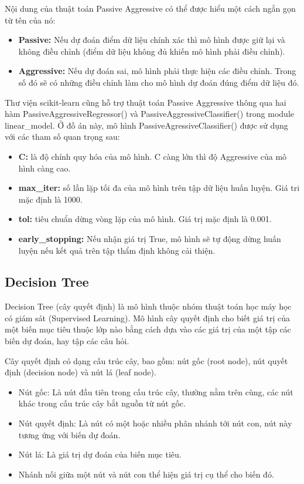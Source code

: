 \documentclass[12pt,a4paper,oneside]{book}
\begin{document}
		Nội dung của thuật toán Passive Aggressive có thể được hiểu một cách ngắn gọn từ tên của nó:

		\begin{itemize}
		\item \textbf{Passive:} Nếu dự đoán điểm dữ liệu chính xác thì mô hình được giữ lại và không điều chỉnh (điểm dữ liệu không đủ khiến mô hình phải điều chỉnh).
		\item \textbf{Aggressive:} Nếu dự đoán sai, mô hình phải thực hiện các điều chỉnh. Trong số đó sẽ có những điều chỉnh làm cho mô hình dự đoán đúng điểm dữ liệu đó.
		\end{itemize}
		
		Thư viện scikit-learn cũng hỗ trợ thuật toán Passive Aggressive thông qua hai hàm PassiveAggressiveRegressor() và PassiveAggressiveClassifier() trong module linear\_model.
		Ở đồ án này, mô hình PassiveAgressiveClassifier() được sử dụng với các tham số quan trọng sau:
		\begin{itemize}
		\item \textbf{C:} là độ chính quy hóa của mô hình. C càng lớn thì độ Aggressive của mô hình càng cao.
		\item \textbf{max\_iter:} số lần lặp tối đa của mô hình trên tập dữ liệu huấn luyện. Giá tri mặc định là 1000.
		\item \textbf{tol:} tiêu chuẩn dừng vòng lặp của mô hình. Giá trị mặc định là 0.001.
		\item \textbf{early\_stopping:} Nếu nhận giá trị True, mô hình sẽ tự động dừng huấn luyện nếu kết quả trên tập thẩm định không cải thiện.
		\end{itemize}
		\subsection{Decision Tree}
		Decision Tree (cây quyết định) là mô hình thuộc nhóm thuật toán học máy học có giám sát (Supervised Learning). Mô hình cây quyết định cho biết giá trị của một biến mục tiêu thuộc lớp nào bằng cách dựa vào các giá trị của một tập các biến dự đoán, hay tập các câu hỏi.
		
		Cây quyết định có dạng cấu trúc cây, bao gồm: nút gốc (root node), nút quyết định (decision node) và nút lá (leaf node).
		
		\begin{itemize}
		\item Nút gốc: Là nút đầu tiên trong cấu trúc cây, thường nằm trên cùng, các nút khác trong cấu trúc cây bắt nguồn từ nút gốc.
		\item Nút quyết định: Là nút có một hoặc nhiều phân nhánh tới nút con, nút này tương ứng với biến dự đoán.
		\item Nút lá: Là giá trị dự đoán của biến mục tiêu.
		\item Nhánh nối giữa một nút và nút con thể hiện giá trị cụ thể cho biến đó.
		\end{itemize}
		
\end{document}
